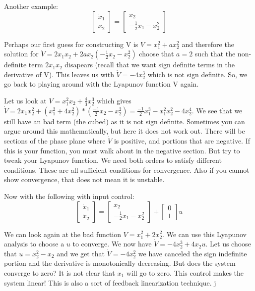 \documentclass[11pt]{article}
\begin{document}
Another example:
\begin{equation}
\begin{bmatrix}
\dot{x}_1 \\
\dot{x}_2
\end{bmatrix} =
\begin{bmatrix}
x_2 \\
-\frac{1}{2}x_1 - x_2^2 
\end{bmatrix}
\end{equation}

Perhaps our first guess for constructing V is $V = x_1^2 + ax_2^2$ and therefore the solution for $\dot{V} = 2x_1x_2 + 2ax_2(-\frac{1}{2}x_2 - x_2^2) $ choose that $a=2$ such that the non-definite term $2x_1x_2$ disapears (recall that we want sign definite terms in the derivative of V). This leaves us with $\dot{V} = -4x_2^3$ which is not sign definite. So, we go back to playing around with the Lyapunov function V again. 


Let us look at $V = x_1^2x_2 + \frac{4}{3}x_2^3$ which gives $\dot{V} = 2x_1x_2^2 + (x_1^2 + 4x_2^2)*(\frac{-1}{2}x_2 - x_2^2) = \frac{-1}{2}x_1^3 - x_1^2x_2^2 - 4x_2^4$. We see that we still have an bad term (the cubed) as it is not sign definite. Sometimes you can argue around this mathematically, but here it does not work out. There will be sections of the phase plane where $\dot{V}$ is positive, and portions that are negative. If this is your function, you must walk about in the negative section. But try to tweak your Lyapunov function. We need both orders to satisfy different conditions. These are all sufficient conditions for convergence. Also if you cannot show convergence, that does not mean it is unstable.

Now with the following with input control: 
\begin{equation}
\begin{bmatrix}
\dot{x}_1 \\
\dot{x}_2
\end{bmatrix} =
\begin{bmatrix}
x_2 \\
-\frac{1}{2}x_1 - x_2^2 
\end{bmatrix} + 
\begin{bmatrix}
0 \\
1
\end{bmatrix}u
\end{equation}

We can look again at the bad function $V = x_1^2 + 2x_2^2$. We can use this Lyapunov analysis to choose a $u$ to converge. We now have $\dot{V} = -4x_2^3 + 4x_2u$. Let us choose that $u = x_2^2 -x_2$ and we get that $\dot{V} = -4x_2^2$ we have canceled the sign indefinite portion and the derivative is monotonically decreasing.  But does the system converge to zero? It is not clear that $x_1$ will go to zero. This control makes the system linear! This is also a sort of feedback linearization technique. j
\end{document}
